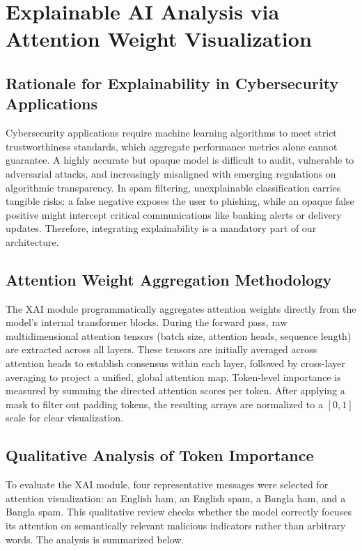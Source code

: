 \documentclass[journal]{IEEEtran}
\begin{document}
\section{Explainable AI Analysis via Attention Weight Visualization}

\subsection{Rationale for Explainability in Cybersecurity Applications}

Cybersecurity applications require machine learning algorithms to meet strict trustworthiness standards, which aggregate performance metrics alone cannot guarantee. A highly accurate but opaque model is difficult to audit, vulnerable to adversarial attacks, and increasingly misaligned with emerging regulations on algorithmic transparency. In spam filtering, unexplainable classification carries tangible risks: a false negative exposes the user to phishing, while an opaque false positive might intercept critical communications like banking alerts or delivery updates. Therefore, integrating explainability is a mandatory part of our architecture.

\subsection{Attention Weight Aggregation Methodology}

The XAI module programmatically aggregates attention weights directly from the model's internal transformer blocks. During the forward pass, raw multidimensional attention tensors (batch size, attention heads, sequence length) are extracted across all layers. These tensors are initially averaged across attention heads to establish consensus within each layer, followed by cross-layer averaging to project a unified, global attention map. Token-level importance is measured by summing the directed attention scores per token. After applying a mask to filter out padding tokens, the resulting arrays are normalized to a $[0, 1]$ scale for clear visualization.

\subsection{Qualitative Analysis of Token Importance}

To evaluate the XAI module, four representative messages were selected for attention visualization: an English ham, an English spam, a Bangla ham, and a Bangla spam. This qualitative review checks whether the model correctly focuses its attention on semantically relevant malicious indicators rather than arbitrary words. The analysis is summarized below.
\end{document}
